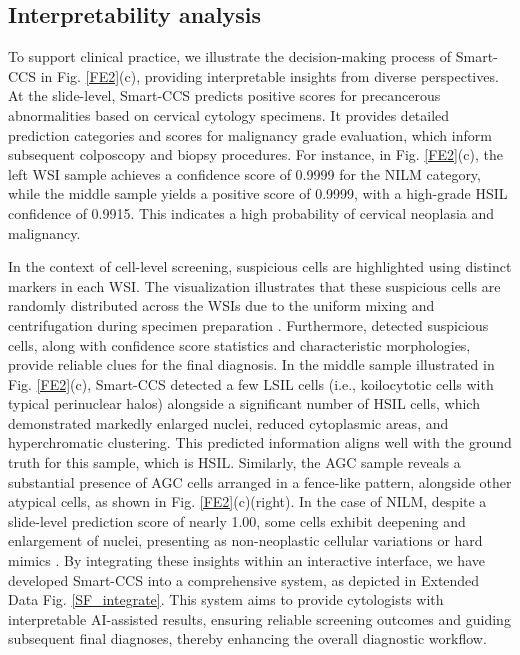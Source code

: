 \subsection*{Interpretability analysis}
To support clinical practice, we illustrate the decision-making process of Smart-CCS in Fig. \ref{FE2}(c), providing interpretable insights from diverse perspectives.
 At the slide-level, Smart-CCS predicts positive scores for precancerous abnormalities based on cervical cytology specimens. It provides detailed prediction categories and scores for malignancy grade evaluation, which inform subsequent colposcopy and biopsy procedures. For instance, in Fig. \ref{FE2}(c), the left WSI sample achieves a confidence score of 0.9999 for the NILM category, while the middle sample yields a positive score of 0.9999, with a high-grade HSIL confidence of 0.9915. This indicates a high probability of cervical neoplasia and malignancy.

In the context of cell-level screening, suspicious cells are highlighted using distinct markers in each WSI. The visualization illustrates that these suspicious cells are randomly distributed across the WSIs due to the uniform mixing and centrifugation during specimen preparation \cite{jiang2023deep}. Furthermore, detected suspicious cells, along with confidence score statistics and characteristic morphologies, provide reliable clues for the final diagnosis. In the middle sample illustrated in Fig. \ref{FE2}(c), Smart-CCS detected a few  LSIL cells (i.e., koilocytotic cells with typical perinuclear halos) alongside a significant number of HSIL cells, which demonstrated markedly enlarged nuclei, reduced cytoplasmic areas, and hyperchromatic clustering. This predicted information aligns well with the ground truth for this sample, which is HSIL. Similarly, the AGC sample reveals a substantial presence of AGC cells arranged in a fence-like pattern, alongside other atypical cells, as shown in Fig. \ref{FE2}(c)(right). In the case of NILM, despite a slide-level prediction score of nearly 1.00, some cells exhibit deepening and enlargement of nuclei, presenting as non-neoplastic cellular variations or hard mimics \cite{nayar2015bethesda}. By integrating these insights within an interactive interface, we have developed Smart-CCS into a comprehensive system, as depicted in Extended Data Fig. \ref{SF_integrate}. This system aims to provide cytologists with interpretable AI-assisted results, ensuring reliable screening outcomes and guiding subsequent final diagnoses, thereby enhancing the overall diagnostic workflow.
